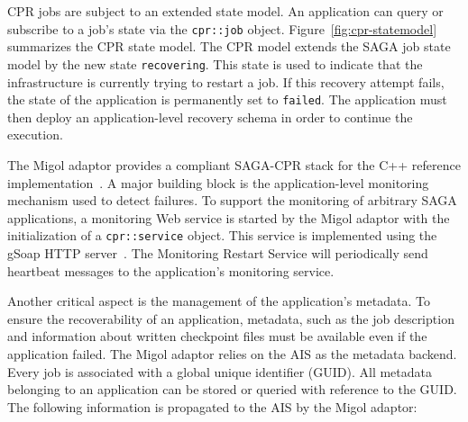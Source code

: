 \documentclass[conference,final]{IEEEtran}
\begin{document}
CPR jobs are subject to an extended state model. An application can
query or subscribe to a job's state via the \texttt{cpr::job} object.
Figure~\ref{fig:cpr-statemodel} summarizes the CPR state model. The
CPR model extends the SAGA job state model by the new state
\texttt{recovering}. This state is used to indicate that the
infrastructure is currently trying to restart a job.  If this recovery
attempt fails, the state of the application is permanently set to
\texttt{failed}.  The application must then deploy an
application-level recovery schema in order to continue the execution.


The Migol adaptor provides a compliant SAGA-CPR stack for the C++
reference implementation~\cite{Kaiser:2006qp}.  A major building block
is the application-level monitoring mechanism used to detect failures.
To support the monitoring of arbitrary SAGA applications, a monitoring
Web service is started by the Migol adaptor with the initialization of
a \texttt{cpr::service} object. This service is implemented using the
gSoap HTTP server~\cite{gsoap}.  The Monitoring Restart Service will
periodically send heartbeat messages to the application's monitoring
service.



Another critical aspect is the management of the application's
metadata. To ensure the recoverability of an application, metadata,
such as the job description and information about written checkpoint
files must be available even if the application failed. The Migol
adaptor relies on the AIS as the metadata backend. Every job is
associated with a global unique identifier (GUID).
All metadata belonging to an application can be stored or queried with
reference to the GUID.  The following information is propagated to the
AIS by the Migol adaptor:
\end{document}
